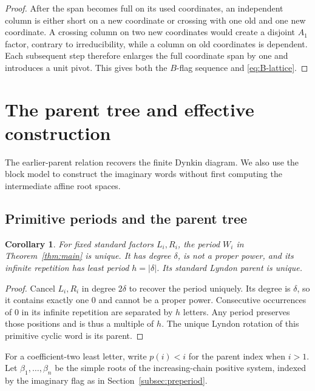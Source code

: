 \documentclass[11pt]{amsart}
\numberwithin{equation}{section}
\newtheorem{corollary}[theorem]{Corollary}
\theoremstyle{definition}
\begin{document}
\begin{proof}
After the span becomes full on its used coordinates, an independent column is either short on a new coordinate or crossing with one old and one new coordinate. A crossing column on two new coordinates would create a disjoint $A_1$ factor, contrary to irreducibility, while a column on old coordinates is dependent. Each subsequent step therefore enlarges the full coordinate span by one and introduces a unit pivot. This gives both the $B$-flag sequence and \eqref{eq:B-lattice}.
\end{proof}


\section{The parent tree and effective construction}\label{sec:construction}

The earlier-parent relation recovers the finite Dynkin diagram. We also use the block model to construct the imaginary words without first computing the intermediate affine root spaces.

\subsection{Primitive periods and the parent tree}
\begin{corollary}\label{cor:primitive-period}
For fixed standard factors $L_i,R_i$, the period $W_i$ in Theorem~\ref{thm:main} is unique. It has degree $\delta$, is not a proper power, and its infinite repetition has least period $h=|\delta|$. Its standard Lyndon parent is unique.
\end{corollary}
\begin{proof}
Cancel $L_i,R_i$ in degree $2\delta$ to recover the period uniquely. Its degree is $\delta$, so it contains exactly one $0$ and cannot be a proper power. Consecutive occurrences of $0$ in its infinite repetition are separated by $h$ letters. Any period preserves those positions and is thus a multiple of $h$. The unique Lyndon rotation of this primitive cyclic word is its parent.
\end{proof}

For a coefficient-two least letter, write $p(i)<i$ for the parent index when $i>1$. Let $\beta_1,\ldots,\beta_n$ be the simple roots of the increasing-chain positive system, indexed by the imaginary flag as in Section~\ref{subsec:preperiod}.
\end{document}
